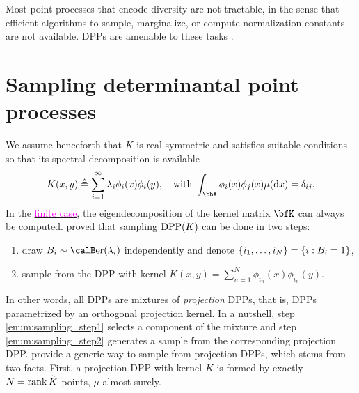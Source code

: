 \documentclass[twoside,11pt]{article}
\begin{document}
\clearpage
        Most point processes that encode diversity are not tractable, in the sense that efficient algorithms to sample, marginalize, or compute normalization constants are not available.
        DPPs are amenable to these tasks \citep{KuTa12,Gil14}.


    \section{Sampling determinantal point processes} %
    \label{sec:sampling}

        We assume henceforth that $K$ is real-symmetric and satisfies suitable conditions \cite[Theorem 3]{Sos00} so that its spectral decomposition is available
        \begin{equation*}
        \label{eq:eigdec_kernel}
        K(x,y)
        \triangleq
          \suml_{i=1}^{\infty}
            \lambda_i \phi_i(x) \phi_i(y),
          \quad \text{with }
            \int_{\bbX} \phi_i(x) \phi_j(x) \mu(\diff x) = \delta_{ij}.
        \end{equation*}
        In the \href{https://dppy.readthedocs.io/en/latest/finite_dpps/exact_sampling.html}{\textcolor{magenta}{finite case}}, the eigendecomposition of the kernel matrix $\bfK$ can always be computed.
        \citet[Theorem 7]{HKPV06} proved that sampling $\operatorname{DPP}(K)$ can be done in two steps:
        \begin{enumerate}
            \item draw $B_i\sim\Ber(\lambda_i)$ independently and denote $\left\{ i_1,\dots,i_{N} \right\} = \left\{ i:B_i=1 \right\}$,\label{enum:sampling_step1}
            \item sample from the DPP with kernel $\tilde{K}(x,y) = \sum_{n=1}^{N}\phi_{i_n}(x) \phi_{i_n}(y)$.\label{enum:sampling_step2}
        \end{enumerate}
        In other words, all DPPs are mixtures of \emph{projection} DPPs, that is, DPPs parametrized by an orthogonal projection kernel.
        In a nutshell, step \ref{enum:sampling_step1} selects a component of the mixture and step \ref{enum:sampling_step2} generates a sample from the corresponding projection DPP.
        \citet[Algorithm 18]{HKPV06} provide a generic way to sample from projection DPPs, which stems from two facts.
        First,  a projection DPP with kernel $\tilde{K}$ is formed by exactly $N=\operatorname{rank} \widetilde{K}$ points, $\mu$-almost surely.
\end{document}
